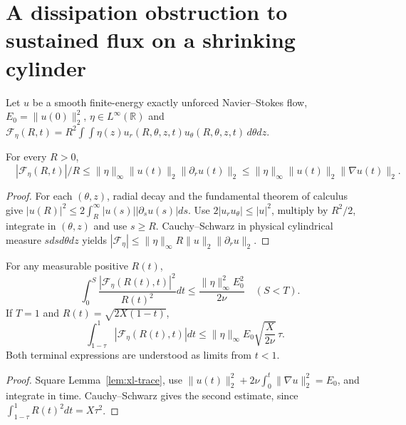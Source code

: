 \section{A dissipation obstruction to sustained flux on a shrinking cylinder}
\label{sec:xl-trace-dissipation}
Let $u$ be a smooth finite-energy exactly unforced Navier--Stokes flow,
$E_0=\|u(0)\|_2^2$, $\eta\in L^\infty(\mathbb R)$ and
$\mathcal F_\eta(R,t)=R^2\int\!\int\eta(z)u_r(R,\theta,z,t)u_\theta(R,\theta,z,t)\,d\theta dz$.

\begin{lemma}\label{lem:xl-trace}
For every $R>0$,
\[
\boxed{\quad |\mathcal F_\eta(R,t)|/R\le
\|\eta\|_\infty\|u(t)\|_2\|\partial_r u(t)\|_2
\le\|\eta\|_\infty\|u(t)\|_2\|\nabla u(t)\|_2.\quad}
\]
\end{lemma}
\begin{proof}
For each $(\theta,z)$, radial decay and the fundamental theorem of calculus give
$|u(R)|^2\le2\int_R^\infty|u(s)||\partial_su(s)|ds$.
Use $2|u_ru_\theta|\le|u|^2$, multiply by $R^2/2$,
integrate in $(\theta,z)$ and use $s\ge R$.
Cauchy--Schwarz in physical cylindrical measure $sdsd\theta dz$
yields $|\mathcal F_\eta|\le
\|\eta\|_\infty R\|u\|_2\|\partial_ru\|_2$.
\end{proof}

\begin{theorem}
\label{thm:xl-moving-dissipation}
For any measurable positive $R(t)$,
\begin{equation}\label{eq:xl-moving-square-budget}
\boxed{\quad
\int_0^S\frac{|\mathcal F_\eta(R(t),t)|^2}{R(t)^2}dt
\le\frac{\|\eta\|_\infty^2 E_0^2}{2\nu}\quad(S<T).}
\end{equation}
If $T=1$ and $R(t)=\sqrt{2X(1-t)}$,
\begin{equation}\label{eq:xl-terminal-advective-total}
\boxed{\quad\int_{1-\tau}^1|\mathcal F_\eta(R(t),t)|dt
\le\|\eta\|_\infty E_0\sqrt{\frac{X}{2\nu}}\,\tau.\quad}
\end{equation}
Both terminal expressions are understood as limits from $t<1$.
\end{theorem}
\begin{proof}
Square Lemma~\ref{lem:xl-trace}, use
$\|u(t)\|_2^2+2\nu\int_0^t\|\nabla u\|_2^2=E_0$,
and integrate in time. Cauchy--Schwarz gives the second estimate,
since $\int_{1-\tau}^1R(t)^2dt=X\tau^2$.
\end{proof}

